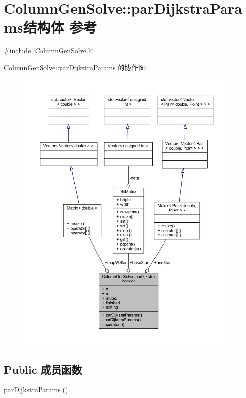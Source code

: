 \hypertarget{structColumnGenSolve_1_1parDijkstraParams}{}\section{Column\+Gen\+Solve\+:\+:par\+Dijkstra\+Params结构体 参考}
\label{structColumnGenSolve_1_1parDijkstraParams}


{\ttfamily \#include \char`\"{}Column\+Gen\+Solve.\+h\char`\"{}}



Column\+Gen\+Solve\+:\+:par\+Dijkstra\+Params 的协作图\+:
\nopagebreak
\begin{figure}[H]
\begin{center}
\leavevmode
\includegraphics[width=350pt]{structColumnGenSolve_1_1parDijkstraParams__coll__graph}
\end{center}
\end{figure}
\subsection*{Public 成员函数}
\begin{DoxyCompactItemize}
\item 
\hyperlink{structColumnGenSolve_1_1parDijkstraParams_ad25b436324e54bcff4bea4e0cb2b87f1}{par\+Dijkstra\+Params} ()
\end{DoxyCompactItemize}
